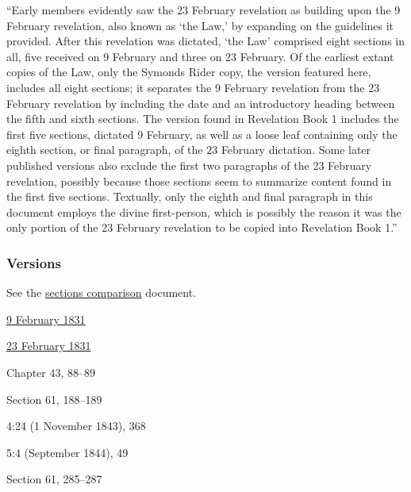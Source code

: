 				``Early members evidently saw the 23 February revelation as building upon the 9 February revelation, also known as `the Law,' by expanding on the guidelines it provided. After this revelation was dictated, `the Law' comprised eight sections in all, five received on 9 February and three on 23 February. Of the earliest extant copies of the Law, only the Symonds Rider copy, the version featured here, includes all eight sections; it separates the 9 February revelation from the 23 February revelation by including the date and an introductory heading between the fifth and sixth sections. The version found in Revelation Book 1 includes the first five sections, dictated 9 February, as well as a loose leaf containing only the eighth section, or final paragraph, of the 23 February dictation. Some later published versions also exclude the first two paragraphs of the 23 February revelation, possibly because those sections seem to summarize content found in the first five sections. Textually, only the eighth and final paragraph in this document employs the divine first-person, which is possibly the reason it was the only portion of the 23 February revelation to be copied into Revelation Book 1.''
			
	\subsubsection{Versions}
		\label{DC42-V}
		
		See the \href{https://drive.google.com/file/d/1goAvNz8jS4R8slYfMG_db55Ty2z_vmgK/view?usp=sharing}{sections comparison} document.
	
		\begin{compactdesc}
			\item[JSP] \phantom{.}
				\begin{compactdesc}
					\item[Verses 1--72] \hyperref[EMS-1831-JS-9-FEB-1831]{9 February 1831}
					\item[Verses 74--93] \hyperref[EMS-1831-JS-23-FEB-1831]{23 February 1831}
				\end{compactdesc}
			\item[BC] Chapter 43, 88--89
			\item[DC 1835] Section 61, 188--189
			\item[TS] 4:24 (1 November 1843), 368
			\item[MS] 5:4 (September 1844), 49
			\item[DC 1844] Section 61, 285--287
		\end{compactdesc}

